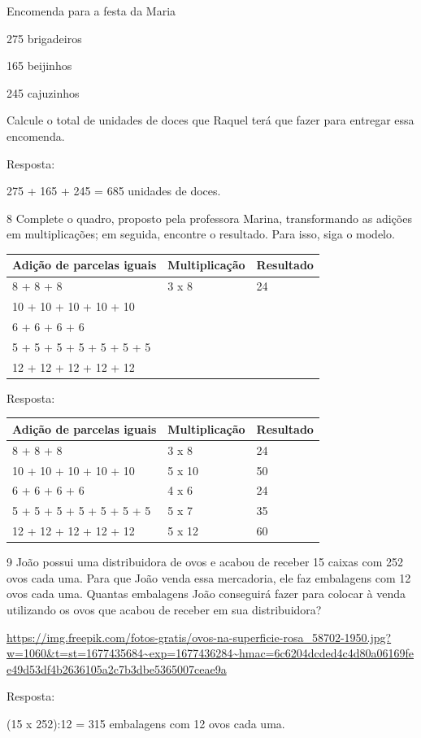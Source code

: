 \begin{escolha}
Encomenda para a festa da Maria

275 brigadeiros

165 beijinhos

245 cajuzinhos

Calcule o total de unidades de doces que Raquel terá que fazer para entregar essa encomenda.


Resposta:

275 + 165 + 245 = 685 unidades de doces.

\num{8} Complete o quadro, proposto pela professora Marina, transformando
as adições em multiplicações; em seguida, encontre o resultado. Para isso, siga o modelo.

\begin{longtable}[]{@{}lll@{}}
\toprule
Adição de parcelas iguais & Multiplicação & Resultado\tabularnewline
\midrule
\endhead
8 + 8 + 8 & 3 x 8 & 24\tabularnewline
10 + 10 + 10 + 10 + 10 & &\tabularnewline
6 + 6 + 6 + 6 & &\tabularnewline
5 + 5 + 5 + 5 + 5 + 5 + 5 & &\tabularnewline
12 + 12 + 12 + 12 + 12 & &\tabularnewline
\bottomrule
\end{longtable}

Resposta:

\begin{longtable}[]{@{}lll@{}}
\toprule
Adição de parcelas iguais & Multiplicação & Resultado\tabularnewline
\midrule
\endhead
8 + 8 + 8 & 3 x 8 & 24\tabularnewline
10 + 10 + 10 + 10 + 10 & 5 x 10 & 50\tabularnewline
6 + 6 + 6 + 6 & 4 x 6 & 24\tabularnewline
5 + 5 + 5 + 5 + 5 + 5 + 5 & 5 x 7 & 35\tabularnewline
12 + 12 + 12 + 12 + 12 & 5 x 12 & 60\tabularnewline
\bottomrule
\end{longtable}

\num{9} João
possui uma distribuidora de ovos e acabou de receber 15 caixas com 252
ovos cada uma. Para que João venda essa mercadoria, ele faz embalagens
com 12 ovos cada uma. Quantas embalagens João conseguirá fazer para
colocar à venda utilizando os ovos que acabou de receber em sua distribuidora?

\url{https://img.freepik.com/fotos-gratis/ovos-na-superficie-rosa_58702-1950.jpg?w=1060\&t=st=1677435684~exp=1677436284~hmac=6c6204dcded4c4d80a06169fee49d53df4b2636105a2c7b3dbe5365007ceae9a}


Resposta:

(15 x 252):12 = 315 embalagens com 12 ovos cada uma.


\end{escolha}
